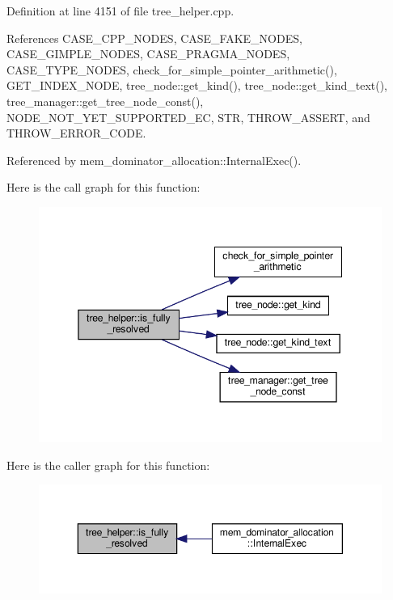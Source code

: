 Definition at line 4151 of file tree\+\_\+helper.\+cpp.



References C\+A\+S\+E\+\_\+\+C\+P\+P\+\_\+\+N\+O\+D\+ES, C\+A\+S\+E\+\_\+\+F\+A\+K\+E\+\_\+\+N\+O\+D\+ES, C\+A\+S\+E\+\_\+\+G\+I\+M\+P\+L\+E\+\_\+\+N\+O\+D\+ES, C\+A\+S\+E\+\_\+\+P\+R\+A\+G\+M\+A\+\_\+\+N\+O\+D\+ES, C\+A\+S\+E\+\_\+\+T\+Y\+P\+E\+\_\+\+N\+O\+D\+ES, check\+\_\+for\+\_\+simple\+\_\+pointer\+\_\+arithmetic(), G\+E\+T\+\_\+\+I\+N\+D\+E\+X\+\_\+\+N\+O\+DE, tree\+\_\+node\+::get\+\_\+kind(), tree\+\_\+node\+::get\+\_\+kind\+\_\+text(), tree\+\_\+manager\+::get\+\_\+tree\+\_\+node\+\_\+const(), N\+O\+D\+E\+\_\+\+N\+O\+T\+\_\+\+Y\+E\+T\+\_\+\+S\+U\+P\+P\+O\+R\+T\+E\+D\+\_\+\+EC, S\+TR, T\+H\+R\+O\+W\+\_\+\+A\+S\+S\+E\+RT, and T\+H\+R\+O\+W\+\_\+\+E\+R\+R\+O\+R\+\_\+\+C\+O\+DE.



Referenced by mem\+\_\+dominator\+\_\+allocation\+::\+Internal\+Exec().

Here is the call graph for this function\+:
\nopagebreak
\begin{figure}[H]
\begin{center}
\leavevmode
\includegraphics[width=345pt]{d7/d99/classtree__helper_ab5d77cdf1e25cde59094436d0980cc5a_cgraph}
\end{center}
\end{figure}
Here is the caller graph for this function\+:
\nopagebreak
\begin{figure}[H]
\begin{center}
\leavevmode
\includegraphics[width=350pt]{d7/d99/classtree__helper_ab5d77cdf1e25cde59094436d0980cc5a_icgraph}
\end{center}
\end{figure}
\mbox{\label{classtree__helper_a05f90f478c4b88ce9445b6537e046a2d}} 
